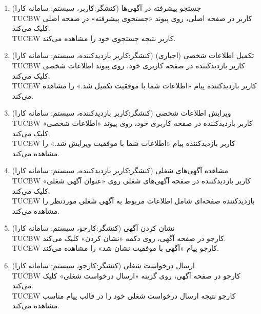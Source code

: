 \documentclass[12pt]{article}
\begin{document}
\begin{enumerate}
		\item
		جستجو پیشرفته در آگهی‌ها (کنشگر:‌کاربر، سیستم: سامانه کارا)\faStar\\
		TUCBW کاربر در صفحه اصلی، روی پیوند «جستجوی پیشرفته» در صفحه اصلی کلیک می‌کند.\\
		TUCEW کاربر نتیجه جستجوی خود را مشاهده می‌کند.\\

		\item
		تکمیل اطلاعات شخصی  (اجباری) (کنشگر:‌کاربر بازدید‌کننده، سیستم: سامانه کارا)\\
		TUCBW کاربر بازدید‌کننده در صفحه کاربری خود، روی پیوند اطلاعات شخصی کلیک می‌کند.\\
		TUCEW کاربر بازدید‌کننده پیام «اطلاعات شما با موفقیت تکمیل شد.» را مشاهده می‌کند.\\

		\item
		ویرایش اطلاعات شخصی (کنشگر:‌کاربر بازدید‌کننده، سیستم: سامانه کارا)\\
		TUCBW کاربر بازدید‌کننده در صفحه کاربری خود، روی پیوند «اطلاعات شخصی» کلیک می‌کند.\\
		TUCEW کاربر بازدید‌کننده پیام «اطلاعات شما با موفقیت ویرایش شد.» را مشاهده می‌کند.\\

		\item
		مشاهده آگهی‌های شغلی (کنشگر:‌کاربر بازدید‌کننده، سیستم: سامانه کارا)\\
		TUCBW کاربر بازدید‌کننده در صفحه آگهی‌های شغلی روی «عنوان آگهی شغلی» کلیک می‌کند.\\
		TUCEW بازدید‌کننده صفحه‌ای شامل اطلاعات مربوط به  آگهی شغلی مورد‌نظر را مشاهده می‌کند.\\

		\item
		نشان کردن آگهی (کنشگر:‌کارجو، سیستم: سامانه کارا)\\
		TUCBW کارجو در صفحه آگهی، روی دکمه «نشان کردن» کلیک می‌کند.\\
		TUCEW کارجو پیام «آگهی با موفقیت نشان شد» را مشاهده می‌کند.\\

		\item
		ارسال درخواست شغلی (کنشگر:کارجو، سیستم: سامانه کارا)\faStar\\
		TUCBW کارجو در صفحه آگهی، روی گزینه «ارسال درخواست شغلی» کلیک می‌کند.\\
		TUCEW کارجو نتیجه ارسال درخواست شغلی خود را در قالب پیام مناسب مشاهده می‌کند.\\


\end{enumerate}
\end{document}
